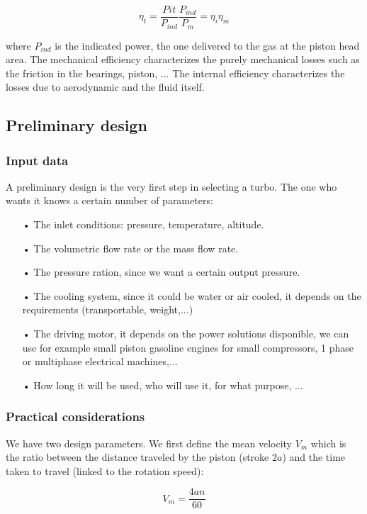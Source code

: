 \begin{equation}
\eta _t = \frac{P{it}}{P_{ind}}\frac{P_{ind}}{P_m} = \eta _i \eta _m
\end{equation}

where $P_{ind}$ is the indicated power, the one delivered to the gas at the piston head area. The mechanical efficiency characterizes the purely mechanical losses such as the friction in the bearings, piston, ... The internal efficiency characterizes the losses due to aerodynamic and the fluid itself. 

\subsection{Preliminary design}
\subsubsection{Input data}
A preliminary design is the very first step in selecting a turbo. The one who wants it knows a certain number of parameters: 

\begin{itemize}
\item[•] The inlet conditions: pressure, temperature, altitude.
\item[•] The volumetric flow rate or the mass flow rate. 
\item[•] The pressure ration, since we want a certain output pressure. 
\item[•] The cooling system, since it could be water or air cooled, it depends on the requirements (transportable, weight,...)
\item[•] The driving motor, it depends on the power solutions disponible, we can use for example small piston gasoline engines for small compressors, 1 phase or multiphase electrical machines,...
\item[•] How long it will be used, who will use it, for what purpose, ...
\end{itemize}

\subsubsection{Practical considerations}
We have two design parameters. We first define the mean velocity $V_m$ which is the ratio between the distance traveled by the piston (stroke $2a$) and the time taken to travel (linked to the rotation speed): 

\begin{equation}
V_m = \frac{4a n}{60}
\end{equation}

